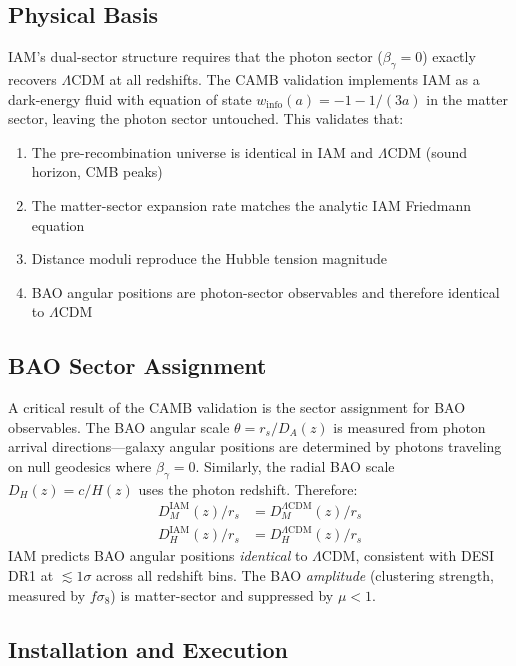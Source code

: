 \documentclass[11pt]{article}
\begin{document}
\subsection{Physical Basis}

IAM's dual-sector structure requires that the photon sector ($\beta_\gamma = 0$) exactly recovers $\Lambda$CDM at all redshifts. The CAMB validation implements IAM as a dark-energy fluid with equation of state $w_\text{info}(a) = -1 - 1/(3a)$ in the matter sector, leaving the photon sector untouched. This validates that:
\begin{enumerate}
    \item The pre-recombination universe is identical in IAM and $\Lambda$CDM (sound horizon, CMB peaks)
    \item The matter-sector expansion rate matches the analytic IAM Friedmann equation
    \item Distance moduli reproduce the Hubble tension magnitude
    \item BAO angular positions are photon-sector observables and therefore identical to $\Lambda$CDM
\end{enumerate}

\subsection{BAO Sector Assignment}

A critical result of the CAMB validation is the sector assignment for BAO observables. The BAO angular scale $\theta = r_s / D_A(z)$ is measured from photon arrival directions---galaxy angular positions are determined by photons traveling on null geodesics where $\beta_\gamma = 0$. Similarly, the radial BAO scale $D_H(z) = c/H(z)$ uses the photon redshift. Therefore:
\begin{align}
D_M^{\text{IAM}}(z) / r_s &= D_M^{\Lambda\text{CDM}}(z) / r_s \nonumber \\
D_H^{\text{IAM}}(z) / r_s &= D_H^{\Lambda\text{CDM}}(z) / r_s
\end{align}
IAM predicts BAO angular positions \textit{identical} to $\Lambda$CDM, consistent with DESI DR1 at $\lesssim 1\sigma$ across all redshift bins. The BAO \textit{amplitude} (clustering strength, measured by $f\sigma_8$) is matter-sector and suppressed by $\mu < 1$.

\subsection{Installation and Execution}
\end{document}
